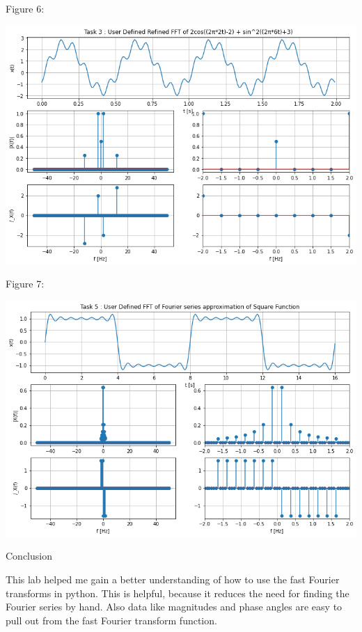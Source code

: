 \documentclass[nobib]{MSword}
\begin{document}
Figure 6:

\includegraphics[scale = 0.6]
{txt/Lab9Fig6.png}

Figure 7:

\includegraphics[scale = 0.6]
{txt/Lab9Fig7.png}


\begin{center}
    Conclusion
\end{center}
    This lab helped me gain a better understanding of how to use the fast Fourier transforms in python. This is helpful, because it reduces the need for finding the Fourier series by hand. Also data like magnitudes and phase angles are easy to pull out from the fast Fourier transform function.
\end{document}
